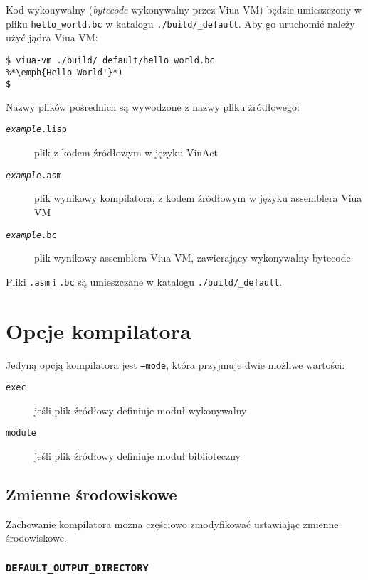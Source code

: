 \documentclass[11pt,oneside,a4paper,titlepage,onecolumn]{article}
\begin{document}
Kod wykonywalny (\emph{bytecode} wykonywalny przez Viua VM) będzie umieszczony w pliku
\texttt{hello\_world.bc} w katalogu \texttt{./build/\_default}.
Aby go uruchomić należy użyć jądra Viua VM:

\begin{lstlisting}
$ viua-vm ./build/_default/hello_world.bc
%*\emph{Hello World!}*)
$
\end{lstlisting}

Nazwy plików pośrednich są wywodzone z nazwy pliku źródłowego:

\begin{description}
    \item[\texttt{\emph{example}.lisp}] plik z kodem źródłowym w języku ViuAct
    \item[\texttt{\emph{example}.asm}] plik wynikowy kompilatora, z kodem źródłowym w języku assemblera Viua
        VM
    \item[\texttt{\emph{example}.bc}] plik wynikowy assemblera Viua VM, zawierający wykonywalny bytecode
\end{description}

Pliki \texttt{.asm} i \texttt{.bc} są umieszczane w katalogu \texttt{./build/\_default}.

\newpage
\section{Opcje kompilatora}

Jedyną opcją kompilatora jest \texttt{--mode}, która przyjmuje dwie możliwe wartości:

\begin{description}
    \item[\texttt{exec}] jeśli plik źródłowy definiuje moduł wykonywalny
    \item[\texttt{module}] jeśli plik źródłowy definiuje moduł biblioteczny
\end{description}

\subsection{Zmienne środowiskowe}

Zachowanie kompilatora można częściowo zmodyfikować ustawiając zmienne środowiskowe.

\subsubsection{\texttt{DEFAULT\_OUTPUT\_DIRECTORY}}
\end{document}
